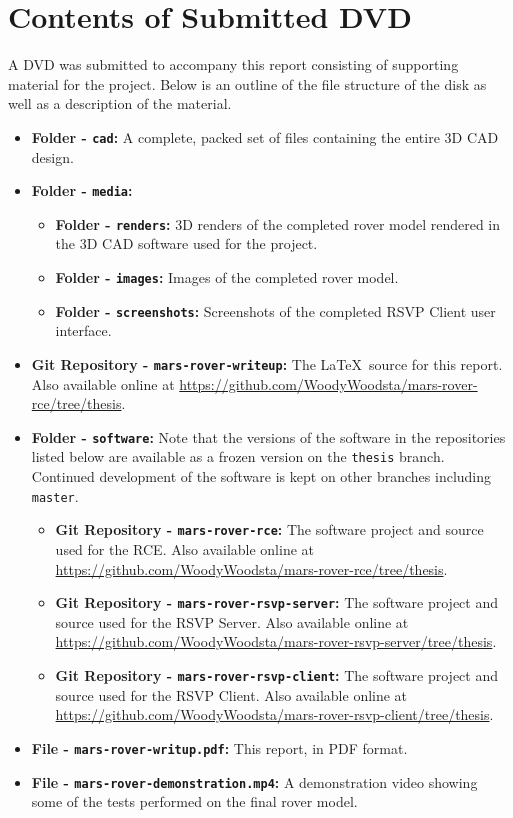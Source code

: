 \chapter{Contents of Submitted DVD}
  A DVD was submitted to accompany this report consisting of supporting material for the project. Below is an outline of the file structure of the disk as well as a description of the material.
  
  \begin{itemize}
    \item \textbf{Folder - \texttt{cad}:} A complete, packed set of files containing the entire 3D CAD design.
    \item \textbf{Folder - \texttt{media}:}
      \begin{itemize}
        \item \textbf{Folder - \texttt{renders}:} 3D renders of the completed rover model rendered in the 3D CAD software used for the project.
        \item \textbf{Folder - \texttt{images}:} Images of the completed rover model.
        \item \textbf{Folder - \texttt{screenshots}:} Screenshots of the completed RSVP Client user interface.
      \end{itemize}
    \item \textbf{Git Repository - \texttt{mars-rover-writeup}:} The \LaTeX~source for this report. Also available online at \url{https://github.com/WoodyWoodsta/mars-rover-rce/tree/thesis}.
    \item \textbf{Folder - \texttt{software}:} Note that the versions of the software in the repositories listed below are available as a frozen version on the \texttt{thesis} branch. Continued development of the software is kept on other branches including \texttt{master}.
      \begin{itemize}
        \item \textbf{Git Repository - \texttt{mars-rover-rce}:} The software project and source used for the RCE. Also available online at \url{https://github.com/WoodyWoodsta/mars-rover-rce/tree/thesis}.
        \item \textbf{Git Repository - \texttt{mars-rover-rsvp-server}:} The software project and source used for the RSVP Server. Also available online at \url{https://github.com/WoodyWoodsta/mars-rover-rsvp-server/tree/thesis}.
        \item \textbf{Git Repository - \texttt{mars-rover-rsvp-client}:} The software project and source used for the RSVP Client. Also available online at \url{https://github.com/WoodyWoodsta/mars-rover-rsvp-client/tree/thesis}.
      \end{itemize}
    \item \textbf{File - \texttt{mars-rover-writup.pdf}:} This report, in PDF format.
    \item \textbf{File - \texttt{mars-rover-demonstration.mp4}:} A demonstration video showing some of the tests performed on the final rover model.
  \end{itemize}